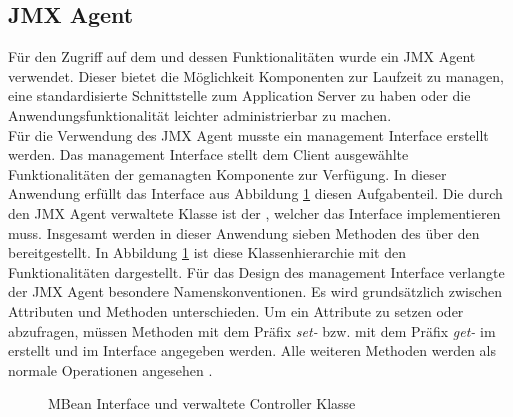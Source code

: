 \subsection{JMX Agent}
\label{controller}

F\"ur den Zugriff auf dem  und dessen Funktionalitäten wurde ein JMX Agent verwendet. Dieser bietet die M\"oglichkeit Komponenten zur Laufzeit zu managen, eine standardisierte Schnittstelle zum Application Server zu haben oder die Anwendungsfunktionalit\"at leichter administrierbar zu machen. \\
Für die Verwendung des JMX Agent musste ein management Interface erstellt werden. Das management Interface stellt dem Client ausgewählte Funktionalitäten der gemanagten Komponente zur Verfügung. In dieser Anwendung erfüllt das Interface  aus Abbildung \ref{MBeanInterfaceUML} diesen Aufgabenteil. Die durch den JMX Agent verwaltete Klasse ist der , welcher das Interface  implementieren muss. Insgesamt werden in dieser Anwendung sieben Methoden des  über den  bereitgestellt. In Abbildung \ref{MBeanInterfaceUML} ist diese Klassenhierarchie mit den Funktionalitäten dargestellt. Für das Design des management Interface verlangte der JMX Agent besondere Namenskonventionen. Es wird grundsätzlich zwischen Attributen und Methoden unterschieden. Um ein Attribute zu setzen oder abzufragen, müssen Methoden mit dem Pr\"afix \textit{set-} bzw. mit dem Präfix \textit{get-} im  erstellt und im Interface angegeben werden. Alle weiteren Methoden werden als normale Operationen angesehen \cite{JMXOracale}. \\

\begin{figure}[!htb] 
\centering
	\caption[UML MBean Interface]{MBean Interface und verwaltete Controller Klasse}
 	\label{MBeanInterfaceUML}
\end{figure}